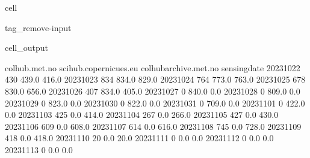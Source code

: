 \documentclass[letterpaper,10pt,english]{jupyterBook}
\begin{document}
\begin{sphinxuseclass}{cell}
\begin{sphinxuseclass}{tag_remove-input}\begin{sphinxVerbatimOutput}

\begin{sphinxuseclass}{cell_output}
\begin{sphinxVerbatim}[commandchars=\\\{\}]
              colhub.met.no  scihub.copernicues.eu  colhub\PYGZhy{}archive.met.no  \PYGZbs{}
sensing\PYGZus{}date                                                                
2023\PYGZhy{}10\PYGZhy{}22              430                  439.0                  416.0   
2023\PYGZhy{}10\PYGZhy{}23              834                  834.0                  829.0   
2023\PYGZhy{}10\PYGZhy{}24              764                  773.0                  763.0   
2023\PYGZhy{}10\PYGZhy{}25              678                  830.0                  656.0   
2023\PYGZhy{}10\PYGZhy{}26              407                  834.0                  405.0   
2023\PYGZhy{}10\PYGZhy{}27                0                  840.0                    0.0   
2023\PYGZhy{}10\PYGZhy{}28                0                  809.0                    0.0   
2023\PYGZhy{}10\PYGZhy{}29                0                  823.0                    0.0   
2023\PYGZhy{}10\PYGZhy{}30                0                  822.0                    0.0   
2023\PYGZhy{}10\PYGZhy{}31                0                  709.0                    0.0   
2023\PYGZhy{}11\PYGZhy{}01                0                  422.0                    0.0   
2023\PYGZhy{}11\PYGZhy{}03              425                    0.0                  414.0   
2023\PYGZhy{}11\PYGZhy{}04              267                    0.0                  266.0   
2023\PYGZhy{}11\PYGZhy{}05              427                    0.0                  430.0   
2023\PYGZhy{}11\PYGZhy{}06              609                    0.0                  608.0   
2023\PYGZhy{}11\PYGZhy{}07              614                    0.0                  616.0   
2023\PYGZhy{}11\PYGZhy{}08              745                    0.0                  728.0   
2023\PYGZhy{}11\PYGZhy{}09              418                    0.0                  418.0   
2023\PYGZhy{}11\PYGZhy{}10               20                    0.0                   20.0   
2023\PYGZhy{}11\PYGZhy{}11                0                    0.0                    0.0   
2023\PYGZhy{}11\PYGZhy{}12                0                    0.0                    0.0   
2023\PYGZhy{}11\PYGZhy{}13                0                    0.0                    0.0   

\end{sphinxVerbatim}
\end{sphinxuseclass}
\end{sphinxVerbatimOutput}
\end{sphinxuseclass}
\end{sphinxuseclass}
\end{document}
